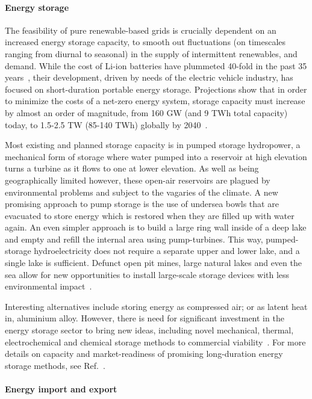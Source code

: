 \documentclass[../SustainableHEP.tex]{subfiles}
\begin{document}
\paragraph{Energy storage}
The feasibility of pure renewable-based grids is crucially dependent on an increased energy storage capacity, to smooth out fluctuations (on timescales ranging from diurnal to seasonal) in the supply of intermittent renewables, and demand.  While the cost of Li-ion batteries have plummeted 40-fold in the past 35 years~\cite{Ziegler_2020}, their development, driven by needs of the electric vehicle industry, has focused on short-duration portable energy storage.  Projections show that in order to minimize the costs of a net-zero energy system, storage capacity must increase by almost an order of magnitude, from 160 GW (and 9 TWh total capacity) today, to 1.5-2.5 TW (85-140 TWh) globally  by 2040~\cite{LDESEnergyStorage}.  

Most existing and planned storage capacity is in pumped storage hydropower, a mechanical form of storage where water pumped into a reservoir at high elevation turns a turbine as it flows to one at lower elevation.  As well as being geographically limited however, these open-air reservoirs are plagued by environmental problems and subject to the vagaries of the climate. 
A new promising approach to pump storage is the use of undersea bowls that are evacuated to store energy which is restored when they are filled up with water again. An even simpler approach is to build a large ring wall inside of a deep lake and empty and refill the internal area using pump-turbines. This way, pumped-storage hydroelectricity does not require a separate upper and lower lake, and a single lake is sufficient.
Defunct open pit mines, large natural lakes and even the sea allow for new opportunities to install large-scale storage devices with less environmental impact~\cite{Dueren,pumpstorage}.  

Interesting alternatives include storing energy as compressed air; or as latent heat in, \eg aluminium alloy.
However, there is need for significant investment in the energy storage sector to bring new ideas, including novel mechanical, thermal, electrochemical and chemical storage methods to commercial viability~\cite{LDESEnergyStorage}.    For more details on capacity and market-readiness of promising long-duration energy storage methods, see Ref.~\cite{LDESEnergyStorage}.

\paragraph{Energy import and export}
\end{document}
